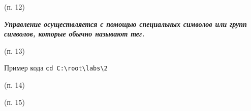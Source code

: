 (п. 12)

\textbf{\emph{Управление осуществляется с помощью специальных символов
или групп символов, которые обычно называют тег.}}

(п. 13)

Пример кода
\texttt{cd\ C:\textbackslash{}root\textbackslash{}labs\textbackslash{}2}

(п. 14)

\begin{Shaded}
\begin{Highlighting}[]
\OperatorTok{=} \OperatorTok{;}

\NormalTok{(}\SpecialCharTok{$\{}\SpecialCharTok{\}}\NormalTok{)}\OperatorTok{;}
\end{Highlighting}
\end{Shaded}

(п. 15)
